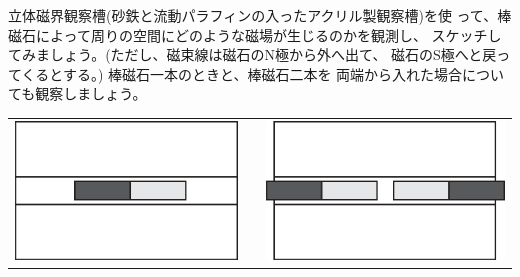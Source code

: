 %
%


立体磁界観察槽(砂鉄と流動パラフィンの入ったアクリル製観察槽)を使
って、棒磁石によって周りの空間にどのような磁場が生じるのかを観測し、
スケッチしてみましょう。(ただし、磁束線は磁石のN極から外へ出て、
磁石のS極へと戻ってくるとする。) 棒磁石一本のときと、棒磁石二本を
両端から入れた場合についても観察しましょう。

\begin{center}
\begin{tabular}{ccc}
\includegraphics[scale=0.6]{06_Magnetism/magnet1.eps}&\hspace*{5mm}&
\includegraphics[scale=0.6]{06_Magnetism/magnet2.eps}
\end{tabular}
\end{center}

%
%

